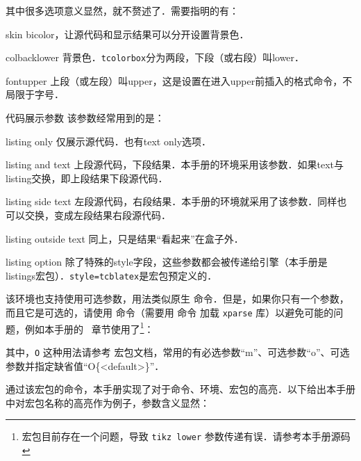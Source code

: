 其中很多选项意义显然，就不赘述了．需要指明的有：
\begin{para}
\item[skin] bicolor，让源代码和显示结果可以分开设置背景色．
\item[colbacklower] 背景色．\texttt{tcolorbox}分为两段，下段（或右段）叫lower．
\item[fontupper] 上段（或左段）叫upper，这是设置在进入upper前插入的格式命令，不局限于字号．
\item[代码展示参数] 该参数经常用到的是：
    \begin{para}
      \item[listing only] 仅展示源代码．也有text only选项．
      \item[listing and text] 上段源代码，下段结果．本手册的环境采用该参数．如果text与listing交换，即上段结果下段源代码．
      \item[listing side text] 左段源代码，右段结果．本手册的环境就采用了该参数．同样也可以交换，变成左段结果右段源代码．
      \item[listing outside text] 同上，只是结果“看起来”在盒子外．
    \end{para}
\item[listing option] 除了特殊的style字段，这些参数都会被传递给引擎（本手册是listings宏包）．\texttt{style=tcblatex}是宏包预定义的．
\end{para}

该环境也支持使用可选参数，用法类似原生  命令．但是，如果你只有一个参数，而且它是可选的，请使用  命令（需要用  命令 加载 \texttt{xparse} 库）以避免可能的问题，例如本手册的 \tikzz\ 章节使用了\footnote{宏包目前存在一个问题，导致 \texttt{tikz lower} 参数传递有误．请参考本手册源码}：
\begin{latex}
\end{latex}
其中，\texttt{O} 这种用法请参考  宏包文档，常用的有必选参数“m”、可选参数“o”、可选参数并指定缺省值“O\{<default>\}”．

通过该宏包的命令，本手册实现了对于命令、环境、宏包的高亮．以下给出本手册中对宏包名称的高亮作为例子，参数含义显然：

